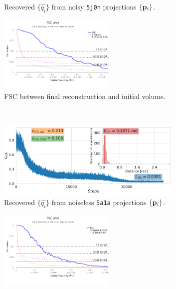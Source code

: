 \begin{figure}[t]
\begin{subfigure}[b]{0.56\linewidth}
        \caption{Recovered $\{ \widehat{q_i} \}$ from noisy \texttt{5j0n} projections $\{ \mathbf{p}_i \}$.
        }%
        \label{fig:5j0n-noise16-orientation-recovery}
    \end{subfigure}
    \hfill
    \begin{subfigure}[b]{0.4\linewidth}
        \centering
        \includegraphics[height=10em]{figures/FSC_5j0n_fullcvg_noise16_fin_vs_init.pdf}
        \caption{FSC between final reconstruction and initial volume.}%
        \label{fig:5j0n-noise16-reconstruction-recovered}
    \end{subfigure}
    \\ \vspace{1em}
    \begin{subfigure}[b]{0.56\linewidth}
        \centering
        \includegraphics[height=10em]{figures/5a1a_noise0_ar_aa}
        \caption{Recovered $\{ \widehat{q_i} \}$ from noiseless \texttt{5a1a} projections $\{ \mathbf{p}_i \}$.
        }%
        \label{fig:5a1a-noise0-orientation-recovery}
    \end{subfigure}
    \hfill
    \begin{subfigure}[b]{0.4\linewidth}
        \centering
        \includegraphics[height=10em]{figures/FSC_5a1a_fin_vs_init.pdf}

\end{subfigure}
\end{figure}

